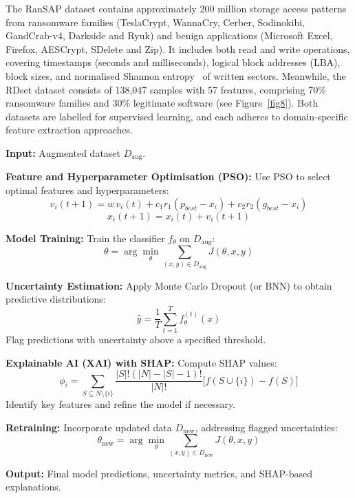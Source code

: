 The RanSAP dataset contains approximately 200 million storage access patterns from ransomware families (TeslaCrypt, WannaCry, Cerber, Sodinokibi, GandCrab-v4, Darkside and Ryuk) and benign  applications (Microsoft Excel, Firefox, AESCrypt, SDelete and Zip). It includes both read and write operations, covering timestamps (seconds and milliseconds), logical block addresses (LBA), block sizes, and normalised Shannon entropy~\cite{shannon1948mathematical} of written sectors. Meanwhile, the RDset dataset consists of 138,047 samples with 57 features,  comprising 70\% ransomware families and 30\% legitimate software (see Figure~\ref{fig8}). Both datasets are labelled for supervised learning, and each adheres to domain-specific feature extraction approaches.

 \begin{algorithm}[H]
\caption{: Model Training, Explainability, and Uncertainty Estimation}
\label{alg:model_training}
\begin{algorithmic}[1]

\State \textbf{Input:} Augmented dataset \( D_{\text{aug}} \).

\State \textbf{Feature and Hyperparameter Optimisation (PSO):}
    \State Use PSO to select optimal features and hyperparameters:
    \[
    v_{i}(t+1) = w \, v_{i}(t) + c_1 r_1 (p_{best} - x_i) + c_2 r_2 (g_{best} - x_i)
    \]
    \[
    x_{i}(t+1) = x_i(t) + v_i(t+1)
    \]

\State \textbf{Model Training:}
    \State Train the classifier \( f_{\theta} \) on \( D_{\text{aug}} \):
    \[
    \theta = \arg\min_{\theta} \sum_{(x,y) \in D_{\text{aug}}} J(\theta, x, y)
    \]

\State \textbf{Uncertainty Estimation:}
    \State Apply Monte Carlo Dropout (or BNN) to obtain predictive distributions:
    \[
    \hat{y} = \frac{1}{T} \sum_{t=1}^{T} f_{\theta}^{(t)}(x)
    \]
    \State Flag predictions with uncertainty above a specified threshold.

\State \textbf{Explainable AI (XAI) with SHAP:}
    \State Compute SHAP values:
    \[
    \phi_i = \sum_{S \subseteq N \setminus \{i\}}
    \frac{|S|!(|N|-|S|-1)!}{|N|!}
    \bigl[ f(S \cup \{i\}) - f(S) \bigr]
    \]
    \State Identify key features and refine the model if necessary.

\State \textbf{Retraining:}
    \State Incorporate updated data \( D_{\text{new}} \), addressing flagged uncertainties:
    \[
    \theta_{\text{new}} = \arg\min_{\theta} \sum_{(x, y) \in D_{\text{new}}} J(\theta, x, y)
    \]

\State \textbf{Output:} Final model predictions, uncertainty metrics, and SHAP-based explanations.

\end{algorithmic}
\end{algorithm}

